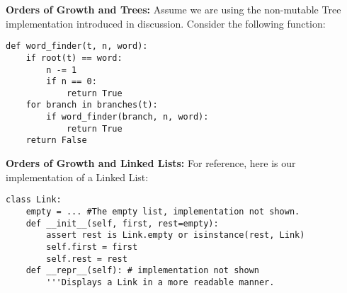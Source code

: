 \documentclass{exam}
\begin{document}
\begin{questions}
\begin{blocksection}
\begin{parts}
\end{parts}
\end{blocksection}

\begin{blocksection}
\question \textbf{Orders of Growth and Trees:} Assume we are using the non-mutable Tree implementation introduced in discussion. Consider the following function:
\begin{lstlisting}
def word_finder(t, n, word):
    if root(t) == word:
        n -= 1
        if n == 0:
            return True
    for branch in branches(t):
        if word_finder(branch, n, word):
            return True
    return False
\end{lstlisting}


\end{blocksection}
\pagebreak
\pagebreak

\begin{blocksection}
\question \textbf{Orders of Growth and Linked Lists:} For reference, here is our implementation of a Linked List:
\begin{lstlisting}
class Link:
    empty = ... #The empty list, implementation not shown.
    def __init__(self, first, rest=empty):
        assert rest is Link.empty or isinstance(rest, Link)
        self.first = first
        self.rest = rest
    def __repr__(self): # implementation not shown
        '''Displays a Link in a more readable manner.
        

\end{lstlisting}
\end{blocksection}
\end{questions}
\end{document}
